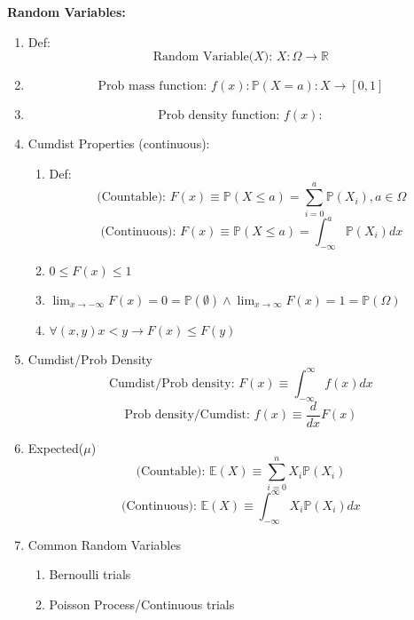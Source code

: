 \documentclass[12pt]{article}
\renewcommand{\=}[1]{\stackrel{#1}{=}} %
\theoremstyle{definition}
\theoremstyle{remark}
\begin{document}
  \newpage
  \textbf{Random Variables:}
  \begin{enumerate}
  \item Def:
    \begin{equation}
      \textrm{Random Variable($X$): } X:\Omega\rightarrow \mathbb{R}
    \end{equation}
  \item
    \begin{equation}
      \textrm{Prob mass function: } f(x): \mathbb{P}(X=a):X\rightarrow [0,1]
    \end{equation}
  \item 
    \begin{equation}
      \textrm{Prob density function: } f(x):
    \end{equation}
  \item Cumdist Properties (continuous):
    \begin{enumerate}
    \item Def:
      \begin{equation}
        \textrm{(Countable): }F(x) \equiv \mathbb{P}(X\leq a) =
        \sum_{i=0}^a\mathbb{P}(X_i), a\in\Omega
      \end{equation}
      \begin{equation}
        \textrm{(Continuous): } F(x) \equiv \mathbb{P}(X\leq a) =
        \int_{-\infty}^a\mathbb{P}(X_i)dx
      \end{equation}
    \item $0 \leq F(x) \leq 1$
    \item $ \lim_{x\rightarrow -\infty}F(x) = 0 = \mathbb{P}(\emptyset) \wedge
      \lim_{x\rightarrow \infty}F(x) = 1 = \mathbb{P}(\Omega)$
    \item $\forall (x,y) x<y \rightarrow F(x) \leq F(y)$
    \end{enumerate}
  \item Cumdist/Prob Density
    \begin{equation}
      \textrm{Cumdist/Prob density: } F(x) \equiv \int_{-\infty}^{\infty} f(x)dx  
    \end{equation}
    \begin{equation}
      \textrm{Prob density/Cumdist: } f(x) \equiv \frac{d}{dx}F(x)
    \end{equation}
  \item Expected($\mu$)
    \begin{equation}
      \textrm{(Countable): } \mathbb{E}(X) \equiv \sum_{i=0}^nX_i\mathbb{P}(X_i)
    \end{equation}
    \begin{equation}
      \textrm{(Continuous): } \mathbb{E}(X) \equiv \int_{-\infty}^{\infty}X_i\mathbb{P}(X_i)dx
    \end{equation}
  \item Common Random Variables
    \begin{enumerate}
    \item Bernoulli trials
    \item Poisson Process/Continuous trials
    \end{enumerate}
  \end{enumerate}
\end{document}

